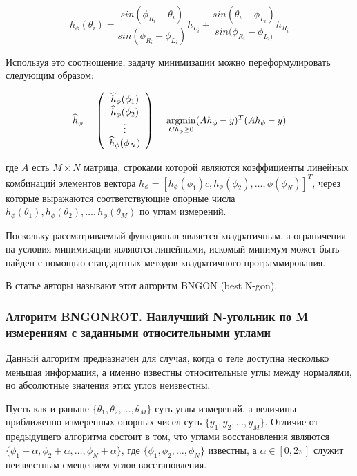 \documentclass[a4paper, 12pt, titlepage]{article}
\theoremstyle{definition}
\theoremstyle{plain}
\theoremstyle{plain}
\begin{document}
\begin{equation}
h_{\phi}(\theta_{i}) =
\frac{sin(\phi_{R_{i}} - \theta_{i})}{sin(\phi_{R_{i}} - \phi_{L_{i}})}
h_{L_{i}} +
\frac{sin(\theta_{i} - \phi_{L_{i}})}{sin(\phi_{R_{i}} - \phi_{L_{i})}}
h_{R_{i}}
\end{equation}

Используя это соотношение, задачу минимизации можно переформулировать следующим
образом:

\begin{equation}
\widehat{h}_{\phi} = \left(
\begin{array}{c}
 \widehat{h}_{\phi}(\phi_{1}) \\
 \widehat{h}_{\phi}(\phi_{2}) \\
 \vdots \\
 \widehat{h}_{\phi}(\phi_{N}) \\
\end{array}
\right) = \operatornamewithlimits{argmin}_{C h_{\phi} \geq 0} (A h_{\phi} -
y)^{T} (A h_{\phi} - y)
\end{equation}

где $A$ есть $M \times N$ матрица, строками которой являются коэффициенты
линейных комбинаций элементов вектора $h_{\phi} = [h_{\phi}(\phi_{1})c,
h_{\phi}(\phi_{2}), \ldots, {\phi}(\phi_{N})]^{T}$, через которые
выражаются соответствующие опорные числа $h_{\phi}(\theta_{1}),
h_{\phi}(\theta_{2}), \ldots, h_{\phi}(\theta_{M})$ по углам измерений.

Поскольку рассматриваемый функционал является квадратичным, а ограничения на
условия минимизации являются линейными, искомый минимум может быть найден с
помощью стандартных методов квадратичного программирования.

В статье авторы называют этот алгоритм BNGON (best N-gon).

\subsubsection{Алгоритм BNGONROT. Наилучший N-угольник по M измерениям с
заданными относительными углами}
\label{sec:support-methods:2d-nonuniform:bngonrot}

Данный алгоритм предназначен для случая, когда о теле доступна несколько
меньшая информация, а именно известны относительные углы между нормалями, но
абсолютные значения этих углов неизвестны.

Пусть как и раньше $\{\theta_{1}, \theta_{2}, \ldots,
\theta_{M}\}$ суть углы измерений, а величины приближенно измеренных опорных
чисел суть $\{y_{1}, y_{2}, \ldots, y_{M}\}$. Отличие от предыдущего алгоритма
состоит в том, что углами восстановления являются $\{\phi_{1} + \alpha,
\phi_{2} + \alpha, \ldots, \phi_{N} + \alpha\}$, где $\{\phi_{1}, \phi_{2},
\ldots, \phi_{N}\}$ известны, а $\alpha \in [0, 2 \pi]$ служит неизвестным
смещением углов восстановления.
\end{document}
